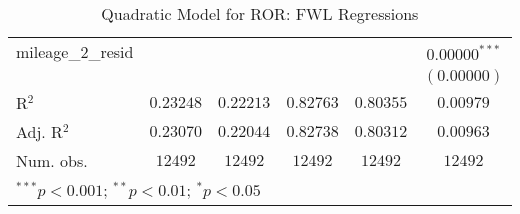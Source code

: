 \begin{table}
\begin{center}
\begin{tabular}{l c c c c c}
mileage\_2\_resid &                  &                  &                     &                           & $0.00000^{***}$  \\
                  &                  &                  &                     &                           & $(0.00000)$      \\
\hline
R$^2$             & $0.23248$        & $0.22213$        & $0.82763$           & $0.80355$                 & $0.00979$        \\
Adj. R$^2$        & $0.23070$        & $0.22044$        & $0.82738$           & $0.80312$                 & $0.00963$        \\
Num. obs.         & $12492$          & $12492$          & $12492$             & $12492$                   & $12492$          \\
\hline
\multicolumn{6}{l}{\scriptsize{$^{***}p<0.001$; $^{**}p<0.01$; $^{*}p<0.05$}}
\end{tabular}
\caption{Quadratic Model for ROR: FWL Regressions}
\label{tab:reg_sq_mileage_fwl}
\end{center}
\end{table}
